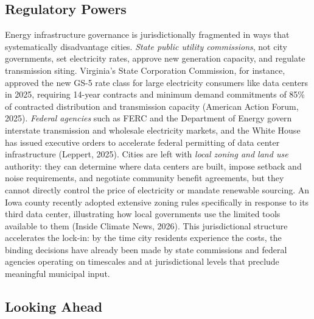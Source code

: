\documentclass[10pt, twocolumn]{article}
\begin{document}
\subsection*{Regulatory Powers}

Energy infrastructure governance is jurisdictionally fragmented in ways that systematically disadvantage cities. \textit{State public utility commissions}, not city governments, set electricity rates, approve new generation capacity, and regulate transmission siting. Virginia's State Corporation Commission, for instance, approved the new GS-5 rate class for large electricity consumers like data centers in 2025, requiring 14-year contracts and minimum demand commitments of 85\% of contracted distribution and transmission capacity (American Action Forum, 2025). \textit{Federal agencies} such as FERC and the Department of Energy govern interstate transmission and wholesale electricity markets, and the White House has issued executive orders to accelerate federal permitting of data center infrastructure (Leppert, 2025). Cities are left with \textit{local zoning and land use} authority: they can determine where data centers are built, impose setback and noise requirements, and negotiate community benefit agreements, but they cannot directly control the price of electricity or mandate renewable sourcing. An Iowa county recently adopted extensive zoning rules specifically in response to its third data center, illustrating how local governments use the limited tools available to them (Inside Climate News, 2026). This jurisdictional structure accelerates the lock-in: by the time city residents experience the costs, the binding decisions have already been made by state commissions and federal agencies operating on timescales and at jurisdictional levels that preclude meaningful municipal input.

\subsection*{Looking Ahead}
\end{document}
